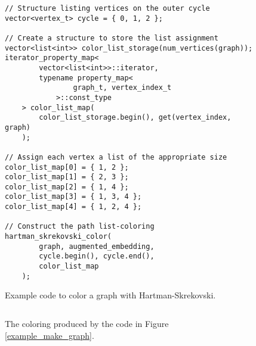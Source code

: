 \documentclass[letterpaper, 12pt]{article}
\theoremstyle{definition}
\theoremstyle{definition}
\theoremstyle{thm}
\theoremstyle{definition}
\begin{document}
\begin{figure}
\begin{lstlisting}[frame=single]
// Structure listing vertices on the outer cycle
vector<vertex_t> cycle = { 0, 1, 2 };

// Create a structure to store the list assignment
vector<list<int>> color_list_storage(num_vertices(graph));
iterator_property_map<
        vector<list<int>>::iterator,
        typename property_map<
                graph_t, vertex_index_t
            >::const_type
    > color_list_map(
        color_list_storage.begin(), get(vertex_index, graph)
    );

// Assign each vertex a list of the appropriate size
color_list_map[0] = { 1, 2 };
color_list_map[1] = { 2, 3 };
color_list_map[2] = { 1, 4 };
color_list_map[3] = { 1, 3, 4 };
color_list_map[4] = { 1, 2, 4 };

// Construct the path list-coloring
hartman_skrekovski_color(
        graph, augmented_embedding,
        cycle.begin(), cycle.end(),
        color_list_map
    );
\end{lstlisting}
\caption{Example code to color a graph with Hartman-Skrekovski.}
\label{example_hartman}
\end{figure}

\begin{figure}
\begin{center}
$\qquad$
\end{center}
\caption{The coloring produced by the code in Figure \ref{example_make_graph}.}
\end{figure}
\end{document}
